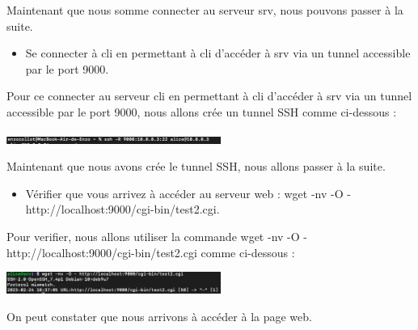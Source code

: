 \documentclass[12pt]{article}
\begin{document}
\vspace{0.3cm}

Maintenant que nous somme connecter au serveur srv, nous pouvons passer à la suite.

\vspace{0.3cm}

\begin{itemize}
  \item Se connecter à cli en permettant à cli d’accéder à srv via un tunnel accessible par le port 9000.
\end{itemize}

\vspace{0.3cm}

Pour ce connecter au serveur cli en permettant à cli d’accéder à srv via un tunnel accessible par le port 9000, nous allons crée un tunnel SSH comme ci-dessous : 

\vspace{0.3cm}

\begin{center}
  \includegraphics[width=7cm]{Image-TD-SSH-6/tunnel-ssh.png}
\end{center}

\vspace{0.3cm}

Maintenant que nous avons crée le tunnel SSH, nous allons passer à la suite. 

\vspace{0.3cm}

\begin{itemize}
  \item Vérifier que vous arrivez à accéder au serveur web : wget -nv -O - http://localhost:9000/cgi-bin/test2.cgi.
\end{itemize}

\vspace{0.3cm}

Pour verifier, nous allons utiliser la commande wget -nv -O - http://localhost:9000/cgi-bin/test2.cgi comme ci-dessous : 

\vspace{0.3cm}

\begin{center}
  \includegraphics[width=7cm]{Image-TD-SSH-6/commande-wget.png}
\end{center}

\vspace{0.3cm}

On peut constater que nous arrivons à accéder à la page web.

\vspace{0.3cm}
\end{document}
